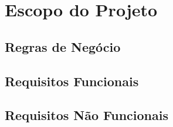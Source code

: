 \section{Escopo do Projeto}

\subsection{Regras de Negócio}
\subsection{Requisitos Funcionais}
\subsection{Requisitos Não Funcionais}